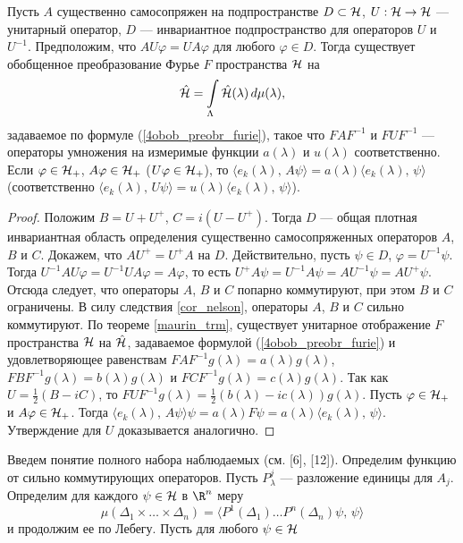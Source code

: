 \documentclass[a4paper
]{article}
\begin{document}
\begin{Cor}
\label{cor_maurin}
Пусть $A$ существенно самосопряжен на подпространстве $D\subset {\cal H}$,
$U:{\cal H}\rightarrow {\cal H}$ --- унитарный оператор, $D$ ---
инвариантное подпространство для операторов $U$ и $U^{-1}$. Предположим, что
$AU\varphi=UA\varphi$ для любого $\varphi\in D$. Тогда существует
обобщенное преобразование Фурье $F$ пространства ${\cal H}$ на
$$\hat{{\cal H}}=\int \limits _{\Lambda}\hat{{\cal H}}(\lambda)\, d\mu
(\lambda),$$ задаваемое по формуле (\ref{4obob_preobr_furie}),
такое что $FAF^{-1}$ и $FUF^{-1}$ --- операторы умножения на
измеримые функции $a(\lambda)$ и $u(\lambda)$ соответственно. Если
$\varphi\in {\cal H}_+$, $A\varphi\in {\cal H}_+$ ($U\varphi\in
{\cal H}_+$), то $\langle e_k(\lambda), \,
A\psi\rangle=a(\lambda)\langle e_k(\lambda), \, \psi\rangle$
(соответственно $\langle e_k(\lambda), \, U\psi\rangle =u(\lambda)\langle
e_k(\lambda), \, \psi\rangle$).
\end{Cor}
\begin{proof}
Положим $B=U+U^+$, $C=i(U-U^+)$. Тогда $D$ --- общая плотная
инвариантная область определения существенно самосопряженных операторов
$A$, $B$ и $C$. Докажем, что $AU^+=U^+A$ на $D$. Действительно, пусть
$\psi\in D$, $\varphi=U^{-1}\psi$. Тогда $U^{-1}AU\varphi=U^{-1}UA\varphi
=A\varphi$, то есть $U^+A\psi=U^{-1}A\psi=AU^{-1}\psi=AU^+\psi$. Отсюда
следует, что операторы $A$, $B$ и $C$ попарно коммутируют, при этом
$B$ и $C$ ограничены. В силу следствия \ref{cor_nelson}, операторы $A$,
$B$ и $C$ сильно коммутируют. По теореме \ref{maurin_trm}, существует
унитарное отображение $F$ пространства ${\cal H}$ на $\hat{{\cal H}}$,
задаваемое формулой (\ref{4obob_preobr_furie}) и удовлетворяющее равенствам
$FAF^{-1}g(\lambda)=a(\lambda)g(\lambda)$, $FBF^{-1}g(\lambda)=b(\lambda)
g(\lambda)$ и $FCF^{-1}g(\lambda)=c(\lambda)g(\lambda)$. Так как
$U=\frac12(B-iC)$, то $FUF^{-1}g(\lambda)=\frac12(b(\lambda)-ic(\lambda))
g(\lambda)$. Пусть $\varphi\in {\cal H}_+$ и $A\varphi\in {\cal H}_+$.
Тогда $\langle e_k(\lambda), \, A\psi\rangle\psi=a(\lambda)F\psi
=a(\lambda)\langle e_k(\lambda), \, \psi\rangle$. Утверждение для $U$
доказывается аналогично.
\end{proof}
Введем понятие полного набора наблюдаемых (см. [6],  [12]).
Определим функцию от сильно коммутирующих операторов. Пусть $P_\lambda^j$
--- разложение единицы для $A_j$. Определим для каждого $\psi \in
{\cal H}$ в $\R^n$ меру
$$\mu(\Delta_1\times\dots\times\Delta_n)=\langle P^1(\Delta_1)
\dots P^n(\Delta_n)\psi, \, \psi \rangle$$
и продолжим ее по Лебегу. Пусть для любого $\psi \in {\cal H}$
\end{document}
